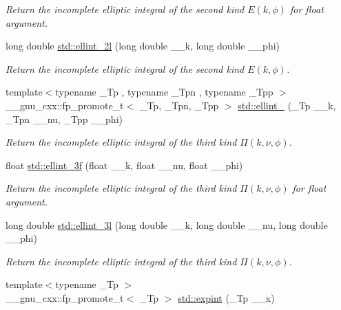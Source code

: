 \begin{DoxyCompactItemize}
\begin{DoxyCompactList}\small\item\em Return the incomplete elliptic integral of the second kind $ E(k,\phi) $ for {\ttfamily float} argument. \end{DoxyCompactList}\item 
long double \hyperlink{group__cxx17__math__spec__func_ga5c791332d374a809d8ca16c69a1a30f5}{std\+::ellint\+\_\+2l} (long double \+\_\+\+\_\+k, long double \+\_\+\+\_\+phi)
\begin{DoxyCompactList}\small\item\em Return the incomplete elliptic integral of the second kind $ E(k,\phi) $. \end{DoxyCompactList}\item 
{\footnotesize template$<$typename \+\_\+\+Tp , typename \+\_\+\+Tpn , typename \+\_\+\+Tpp $>$ }\\\+\_\+\+\_\+gnu\+\_\+cxx\+::fp\+\_\+promote\+\_\+t$<$ \+\_\+\+Tp, \+\_\+\+Tpn, \+\_\+\+Tpp $>$ \hyperlink{group__cxx17__math__spec__func_gaac0240d1e7e401e652b9d1adf4c7e029}{std\+::ellint\+\_} (\+\_\+\+Tp \+\_\+\+\_\+k, \+\_\+\+Tpn \+\_\+\+\_\+nu, \+\_\+\+Tpp \+\_\+\+\_\+phi)
\begin{DoxyCompactList}\small\item\em Return the incomplete elliptic integral of the third kind $ \Pi(k,\nu,\phi) $. \end{DoxyCompactList}\item 
float \hyperlink{group__cxx17__math__spec__func_ga1a80bd2c15bc9fbecda2630a9e9409e7}{std\+::ellint\+\_\+3f} (float \+\_\+\+\_\+k, float \+\_\+\+\_\+nu, float \+\_\+\+\_\+phi)
\begin{DoxyCompactList}\small\item\em Return the incomplete elliptic integral of the third kind $ \Pi(k,\nu,\phi) $ for {\ttfamily float} argument. \end{DoxyCompactList}\item 
long double \hyperlink{group__cxx17__math__spec__func_gaa8c0e5864df8769021a7f3e21a30c5d2}{std\+::ellint\+\_\+3l} (long double \+\_\+\+\_\+k, long double \+\_\+\+\_\+nu, long double \+\_\+\+\_\+phi)
\begin{DoxyCompactList}\small\item\em Return the incomplete elliptic integral of the third kind $ \Pi(k,\nu,\phi) $. \end{DoxyCompactList}\item 
{\footnotesize template$<$typename \+\_\+\+Tp $>$ }\\\+\_\+\+\_\+gnu\+\_\+cxx\+::fp\+\_\+promote\+\_\+t$<$ \+\_\+\+Tp $>$ \hyperlink{group__cxx17__math__spec__func_ga0e9ac717a106ef54184b5f058c451782}{std\+::expint} (\+\_\+\+Tp \+\_\+\+\_\+x)

\end{DoxyCompactItemize}
